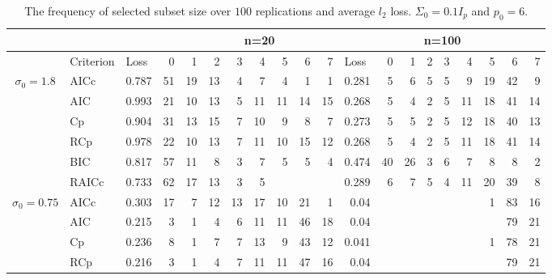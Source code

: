 \documentclass[11pt]{article}
\begin{document}
{\begin{table}[!ht]
\centering
\small
\caption{The frequency of selected subset size over $100$ replications and average $l_2$ loss. $\Sigma_0=0.1 I_p$ and $p_0=6$.}
\begin{tabular}{clrrrrrrrrr|rrrrrrrrr}
      &       &       &       & \multicolumn{7}{c|}{n=20}                             & \multicolumn{9}{c}{n=100} \\
\midrule
      & Criterion & \multicolumn{1}{l}{Loss} & 0     & 1     & 2     & 3     & 4     & 5     & 6     & 7     & \multicolumn{1}{l}{Loss} & 0     & 1     & 2     & 3     & 4     & 5     & 6     & 7 \\
\midrule
\multirow{6}[2]{*}{$\sigma_0=1.8$} & AICc  & 0.787 & 51    & 19    & 13    & 4     & 7     & 4     & 1     & 1     & 0.281 & 5     & 6     & 5     & 5     & 9     & 19    & 42    & 9 \\
      & AIC   & 0.993 & 21    & 10    & 13    & 5     & 11    & 11    & 14    & 15    & 0.268 & 5     & 4     & 2     & 5     & 11    & 18    & 41    & 14 \\
      & Cp    & 0.904 & 31    & 13    & 15    & 7     & 10    & 9     & 8     & 7     & 0.273 & 5     & 5     & 2     & 5     & 12    & 18    & 40    & 13 \\
      & RCp   & 0.978 & 22    & 10    & 13    & 7     & 11    & 10    & 15    & 12    & 0.268 & 5     & 4     & 2     & 5     & 11    & 18    & 41    & 14 \\
      & BIC   & 0.817 & 57    & 11    & 8     & 3     & 7     & 5     & 5     & 4     & 0.474 & 40    & 26    & 3     & 6     & 7     & 8     & 8     & 2 \\
      & RAICc & 0.733 & 62    & 17    & 13    & 3     & 5     &       &       &       & 0.289 & 6     & 7     & 5     & 4     & 11    & 20    & 39    & 8 \\
\midrule
\multirow{6}[2]{*}{$\sigma_0=0.75$} & AICc  & 0.303 & 17    & 7     & 12    & 13    & 17    & 10    & 21    & 1     & 0.04  &       &       &       &       &       & 1     & 83    & 16 \\
      & AIC   & 0.215 & 3     & 1     & 4     & 6     & 11    & 11    & 46    & 18    & 0.04  &       &       &       &       &       &       & 79    & 21 \\
      & Cp    & 0.236 & 8     & 1     & 7     & 7     & 13    & 9     & 43    & 12    & 0.041 &       &       &       &       &       & 1     & 78    & 21 \\
      & RCp   & 0.216 & 3     & 1     & 4     & 7     & 11    & 11    & 47    & 16    & 0.04  &       &       &       &       &       &       & 79    & 21 \\

\end{tabular}
\end{table}}
\end{document}
